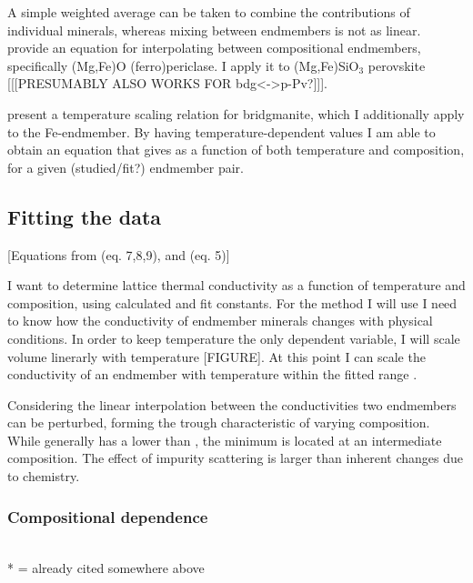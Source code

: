 A simple weighted average can be taken to combine the contributions of individual minerals, whereas mixing between endmembers is not as linear. \citet{Ohta2017} provide an equation for interpolating \cs between compositional endmembers, specifically (Mg,Fe)O (ferro)periclase. I apply it to (Mg,Fe)SiO$_3$ perovskite [[[PRESUMABLY ALSO WORKS FOR bdg<->p-Pv?]]]. 

\citet{Okuda2017} present a temperature scaling relation for bridgmanite, which I additionally apply to the Fe-endmember. By having temperature-dependent values I am able to obtain an equation that gives \tcs as a function of both temperature and composition, for a given (studied/fit?) endmember pair.

\subsection{Fitting the data} 

[Equations from \cite{Ohta2017} (eq. 7,8,9), and \cite{Okuda2017} (eq. 5)]

I want to determine lattice thermal conductivity as a function of temperature and composition, 
using calculated and fit constants. For the method I will use I need to know how the conductivity of endmember minerals changes with physical conditions. In order to keep temperature the only dependent variable, I will scale volume linerarly with temperature [FIGURE]. At this point I can scale the conductivity of an endmember with temperature within the fitted range \citep{Okuda2017}.

Considering \citet{Ohta2017} the linear interpolation between the conductivities two endmembers can be perturbed, forming the trough characteristic of varying composition. While \fesios generally has a lower \tcs than \mgsio, the minimum is located at an intermediate composition. The effect of impurity scattering is larger than inherent changes due to chemistry.
    
\subsubsection{Compositional dependence}
\cite{Ohta2017}\\
* = already cited somewhere above\\

